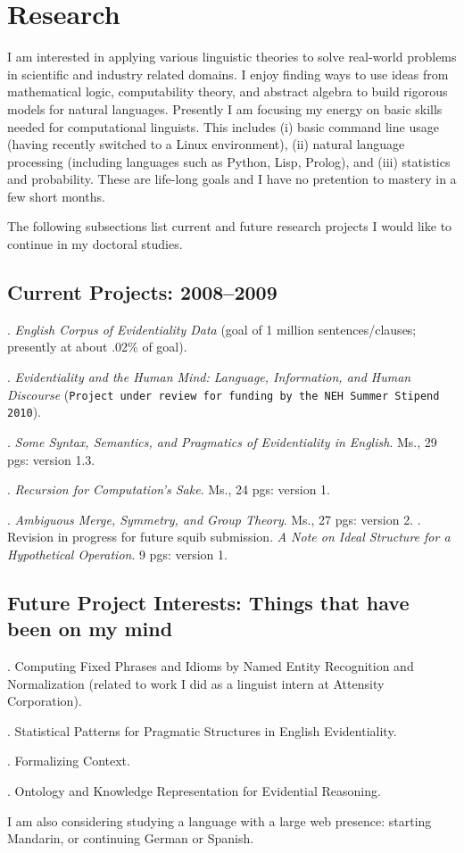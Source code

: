 \documentclass[11pt]{article}
\begin{document}
\section{Research}
I am interested in applying various linguistic theories to solve real-world problems in scientific and industry related domains. I enjoy finding ways to use ideas from mathematical logic, computability theory, and abstract algebra to build rigorous models for natural languages. Presently I am focusing my energy on basic skills needed for computational linguists. This includes (i) basic command line usage (having recently switched to a Linux environment), (ii) natural language processing (including languages such as Python, Lisp, Prolog), and (iii) statistics and probability. These are life-long goals and I have no pretention to mastery in a few short months.   

The following subsections list current and future research projects I would like to continue in my doctoral studies. 

\subsection{Current Projects: 2008--2009}
\ex. \textsl{English Corpus of Evidentiality Data} (goal of 1 million sentences/clauses; presently at about .02\% of goal).

\ex. \textsl{Evidentiality and the Human Mind: Language, Information, and Human Discourse} (\texttt{Project under review for funding by the NEH Summer Stipend 2010}). 

\ex. \textsl{Some Syntax, Semantics, and Pragmatics of Evidentiality in English}. Ms., 29 pgs: version 1.3. 

\ex. \textsl{Recursion for Computation's Sake}. Ms., 24 pgs: version 1.

\ex. \textsl{Ambiguous Merge, Symmetry, and Group Theory}. Ms., 27 pgs: version 2. 
\a.  \small{Revision in progress for future squib submission. \textsl{A Note on Ideal Structure for a Hypothetical Operation}. 9 pgs: version 1}.

\subsection{Future Project Interests: Things that have been on my mind}
\ex. Computing Fixed Phrases and Idioms by Named Entity Recognition and Normalization (\small{related to work I did as a linguist intern at Attensity Corporation}).

\ex. Statistical Patterns for Pragmatic Structures in English Evidentiality. 

\ex. Formalizing Context.

\ex. Ontology and Knowledge Representation for Evidential Reasoning.

I am also considering studying a language with a large web presence: starting Mandarin, or continuing German or Spanish.
\end{document}
